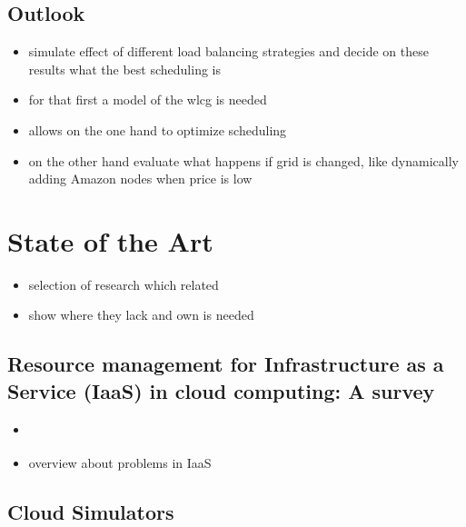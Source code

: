 \section{Outlook}
\label{sec:Motivation:Outlook}

\begin{itemize}
	\item simulate effect of different load balancing strategies and decide on these results what the best scheduling is
	\item for that first a model of the wlcg is needed
	\item allows on the one hand to optimize scheduling
	\item on the other hand evaluate what happens if grid is changed, like dynamically adding Amazon nodes when price is low
\end{itemize}



\chapter{State of the Art}
\label{ch:SecondContent}

\begin{itemize}
	\item selection of research which related 
	\item show where they lack and own is needed
\end{itemize}

\section{Resource management for Infrastructure as a Service (IaaS) in cloud computing: A survey}
\label{sec:StateOfTheArt:SurveyResouceManagement}
\begin{itemize}
	\item \cite{manvi2014resource}
	\item overview about problems in IaaS
\end{itemize}

\section{Cloud Simulators}


